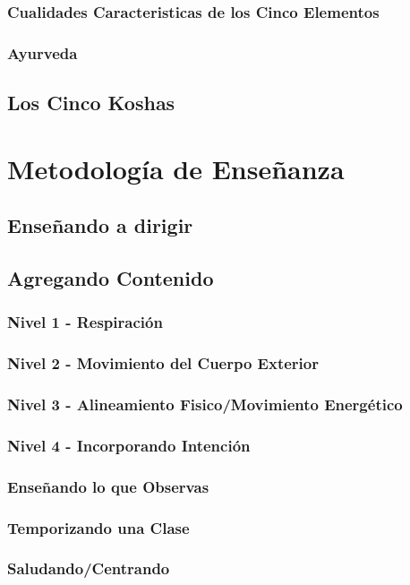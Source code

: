 \documentclass[a4paper]{article}
\begin{document}
\subsubsection{Cualidades Caracteristicas de los Cinco Elementos}
\subsubsection{Ayurveda}
\subsection{Los Cinco Koshas}

\section{Metodología de Enseñanza}
\subsection{Enseñando a dirigir}
\subsection{Agregando Contenido}
\subsubsection{Nivel 1 - Respiración}
\subsubsection{Nivel 2 - Movimiento del Cuerpo Exterior}
\subsubsection{Nivel 3 - Alineamiento Fisico/Movimiento Energético}
\subsubsection{Nivel 4 - Incorporando Intención}
\subsubsection{Enseñando lo que Observas}
\subsubsection{Temporizando una Clase}
\subsubsection{Saludando/Centrando}
\end{document}
